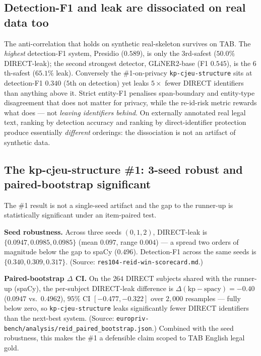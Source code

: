 \documentclass[11pt]{article}
\begin{document}
\subsection{Detection-F1 and leak are dissociated on real data too}
\label{sec:tab-dissociation}
The anti-correlation that holds on synthetic real-skeleton survives on TAB. The \emph{highest}
detection-F1 system, Presidio ($0.589$), is only the $3$rd-safest ($50.0\%$ DIRECT-leak); the second
strongest detector, GLiNER2-base (F1 $0.545$), is the $6$th-safest ($65.1\%$ leak). Conversely the
\#1-on-privacy \texttt{kp-cjeu-structure} sits at detection-F1 $0.340$ ($5$th on detection) yet leaks
$5\times$ fewer DIRECT identifiers than anything above it. Strict entity-F1 penalises span-boundary
and entity-type disagreement that does not matter for privacy, while the re-id-risk metric rewards
what does --- not \emph{leaving identifiers behind}. On externally annotated real legal text, ranking
by detection accuracy and ranking by direct-identifier protection produce essentially \emph{different}
orderings: the dissociation is not an artifact of synthetic data.

\subsection{The kp-cjeu-structure \#1: 3-seed robust and paired-bootstrap significant}
\label{sec:tab-significance}
The \#1 result is not a single-seed artifact and the gap to the runner-up is statistically
significant under an item-paired test.

\textbf{Seed robustness.} Across three seeds $(0,1,2)$, DIRECT-leak is
$\{0.0947, 0.0985, 0.0985\}$ (mean $0.097$, range $0.004$) --- a spread two orders of magnitude
below the gap to spaCy ($0.496$). Detection-F1 across the same seeds is $\{0.340, 0.309, 0.317\}$.
(Source: \texttt{res104-reid-win-scorecard.md}.)

\textbf{Paired-bootstrap $\Delta$ CI.} On the $264$ DIRECT subjects shared with the runner-up
(spaCy), the per-subject DIRECT-leak difference is
$\Delta(\text{kp}-\text{spacy}) = -0.40$ ($0.0947$ vs.\ $0.4962$), $95\%$ CI $[-0.477, -0.322]$ over
$2{,}000$ resamples --- fully below zero, so \texttt{kp-cjeu-structure} leaks significantly fewer
DIRECT identifiers than the next-best system. (Source:
\texttt{europriv-bench/analysis/reid\_paired\_bootstrap.json}.) Combined with the seed robustness,
this makes the \#1 a defensible claim scoped to TAB English legal gold.
\end{document}
